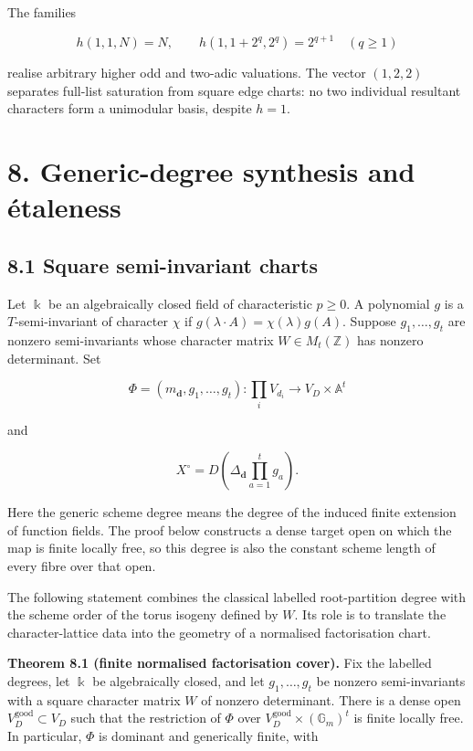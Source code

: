 \documentclass[
  11pt,
  a4paper,
]{article}
\begin{document}
The families

\[
 h(1,1,N)=N,
 \qquad
 h(1,1+2^q,2^q)=2^{q+1}\quad(q\ge1)
\tag{7.13}
\]

realise arbitrary higher odd and two-adic valuations. The vector
\((1,2,2)\) separates full-list saturation from square edge charts: no
two individual resultant characters form a unimodular basis, despite
\(h=1\).

\section{8. Generic-degree synthesis and
étaleness}\label{generic-degree-synthesis-and-uxe9taleness}

\subsection{8.1 Square semi-invariant
charts}\label{square-semi-invariant-charts}

Let \(\Bbbk\) be an algebraically closed field of characteristic
\(p\ge0\). A polynomial \(g\) is a \(T\)-semi-invariant of character
\(\chi\) if \(g(\lambda\cdot A)=\chi(\lambda)g(A)\). Suppose
\(g_1,\ldots,g_t\) are nonzero semi-invariants whose character matrix
\(W\in M_t(\mathbb Z)\) has nonzero determinant. Set

\[
 \Phi=(m_{\mathbf d},g_1,\ldots,g_t):
 \prod_iV_{d_i}\longrightarrow V_D\times\mathbb A^t
\]

and

\[
 X^\circ=D\!\left(\Delta_{\mathbf d}\prod_{a=1}^tg_a\right).
\]

Here the generic scheme degree means the degree of the induced finite
extension of function fields. The proof below constructs a dense target
open on which the map is finite locally free, so this degree is also the
constant scheme length of every fibre over that open.

The following statement combines the classical labelled root-partition
degree with the scheme order of the torus isogeny defined by \(W\). Its
role is to translate the character-lattice data into the geometry of a
normalised factorisation chart.

\textbf{Theorem 8.1 (finite normalised factorisation cover).} Fix the
labelled degrees, let \(\Bbbk\) be algebraically closed, and let
\(g_1,\ldots,g_t\) be nonzero semi-invariants with a square character
matrix \(W\) of nonzero determinant. There is a dense open
\(V_D^{\mathrm{good}}\subset V_D\) such that the restriction of \(\Phi\)
over \(V_D^{\mathrm{good}}\times(\mathbb G_m)^t\) is finite locally
free. In particular, \(\Phi\) is dominant and generically finite, with
\end{document}
